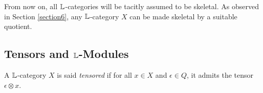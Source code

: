 %
%
%
%
%
% 
%
% 
%
%
%

From now on, all $\mathbb{L}$-categories will be tacitly assumed to be skeletal. As observed in Section \ref{section6}, any $\mathbb{L}$-category $X$ can be made skeletal by a suitable quotient.


\subsection{Tensors and $\mathbb{L}$-Modules}

\begin{definition}
A $\mathbb{L}$-category $X$ is said \emph{tensored} if for all $x\in X$ and $\epsilon \in Q$, it admits the tensor $\epsilon \otimes x$.
\end{definition}


